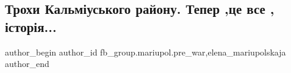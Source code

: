  
 
 
 
 

\subsection{Трохи Кальміуського району. Тепер ,це все , історія...}
\label{sec:27_01_2023.fb.fb_group.mariupol.pre_war.1.trokhi_kalm_uskogo_r}
 
\ifcmt
 author_begin
   author_id fb_group.mariupol.pre_war,elena_mariupolskaja
 author_end
\fi
